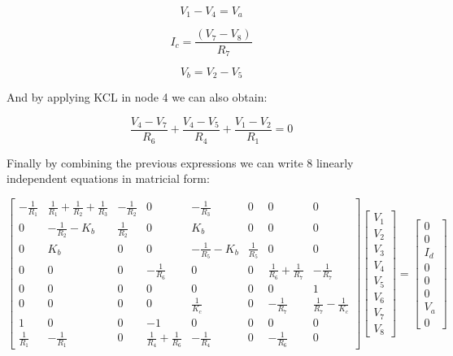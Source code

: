 \begin{equation}
    V_1 - V_4 = V_a
\end{equation}

\begin{equation}
    I_c = \frac{(V_7 - V_8)}{R_7}
\end{equation}

\begin{equation}
    V_b = V_2 - V_5
\end{equation}

And by applying KCL in node 4 we can also obtain:

\begin{equation}
    \frac{V_4 - V_7}{R_6} + \frac{V_4 - V_5}{R_4} + \frac{V_1 - V_2}{R_1} = 0
\end{equation}

Finally by combining the previous expressions we can write 8 linearly independent equations in matricial form:

\begin{equation}
  \begin{bmatrix}
    -\frac{1}{R_1} & \frac{1}{R_1} + \frac{1}{R_2} + \frac{1}{R_3} & -\frac{1}{R_2} & 0 & -\frac{1}{R_3} & 0 & 0 & 0\\
    0 & -\frac{1}{R_2} - K_b & \frac{1}{R_2} & 0 & K_b & 0 & 0 & 0\\
    0 & K_b & 0 & 0 & -\frac{1}{R_5} - K_b & \frac{1}{R_5} & 0 & 0\\
    0 & 0 & 0 & - \frac{1}{R_6} & 0 & 0 & \frac{1}{R_6} + \frac{1}{R_7} & - \frac{1}{R_7}\\
    0 & 0 & 0 & 0 & 0 & 0 & 0 & 1\\
    0 & 0 & 0 & 0 & \frac{1}{K_c} & 0 & - \frac{1}{R_7} & \frac{1}{R_7} - \frac{1}{K_c}\\ 
    1 & 0 & 0 & -1 & 0 & 0 & 0 & 0\\
    \frac{1}{R_1} & -\frac{1}{R_1} & 0 & \frac{1}{R_4} + \frac{1}{R_6} & - \frac{1}{R_4} & 0 & - \frac{1}{R_6} & 0
  \end{bmatrix}
  \begin{bmatrix}
    V_1\\
    V_2\\
    V_3\\
    V_4\\
    V_5\\
    V_6\\
    V_7\\
    V_8
  \end{bmatrix}
  =
  \begin{bmatrix}
    0\\
    0\\
    I_d\\
    0\\
    0\\
    0\\
    V_a\\
    0
  \end{bmatrix}
\end{equation}

